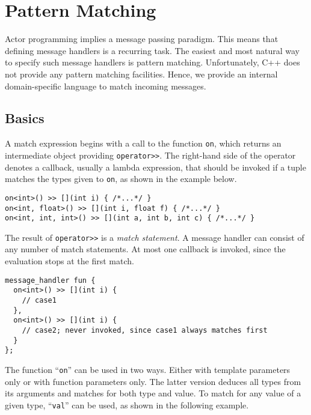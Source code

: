 \section{Pattern Matching}
\label{Sec::PatternMatching}

Actor programming implies a message passing paradigm.
This means that defining message handlers is a recurring task.
The easiest and most natural way to specify such message handlers is pattern matching.
Unfortunately, C++ does not provide any pattern matching facilities.
Hence, we provide an internal domain-specific language to match incoming messages.

\subsection{Basics}
\label{Sec::PatternMatching::Basics}

A match expression begins with a call to the function \lstinline^on^, which returns an intermediate object providing \lstinline^operator>>^.
The right-hand side of the operator denotes a callback, usually a lambda expression, that should be invoked if a tuple matches the types given to \lstinline^on^,
as shown in the example below.

\begin{lstlisting}
on<int>() >> [](int i) { /*...*/ }
on<int, float>() >> [](int i, float f) { /*...*/ }
on<int, int, int>() >> [](int a, int b, int c) { /*...*/ }
\end{lstlisting}

The result of \lstinline^operator>>^ is a \textit{match statement}.
A message handler can consist of any number of match statements.
At most one callback is invoked, since the evaluation stops at the first match.

\begin{lstlisting}
message_handler fun {
  on<int>() >> [](int i) {
    // case1
  },
  on<int>() >> [](int i) {
    // case2; never invoked, since case1 always matches first
  }
};
\end{lstlisting}

The function ``\lstinline^on^'' can be used in two ways.
Either with template parameters only or with function parameters only.
The latter version deduces all types from its arguments and matches for both type and value.
To match for any value of a given type, ``\lstinline^val^'' can be used, as shown in the following example.

